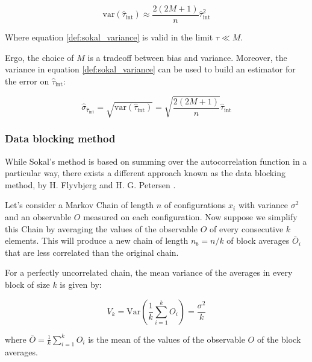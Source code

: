 \begin{equation}
    \label{def:sokal_variance}
    \mathrm{var}(\widehat{\tau}_{\mathrm{int}}) \approx \frac{2(2M + 1)}{n} \hat{\tau}_{\mathrm{int}}^2
\end{equation}

Where equation \ref{def:sokal_variance} is valid in the limit $\tau \ll M$.

Ergo, the choice of $M$ is a tradeoff between bias and variance. Moreover, the variance in equation \ref{def:sokal_variance} can be used to build an estimator for the error on $\hat{\tau}_{\text{int}}$:

\begin{equation}
    \label{def:tau_sokal_error}
    \hat{\sigma}_{\hat{\tau}_{\text{int}}} = \sqrt{\mathrm{var}(\widehat{\tau}_{\mathrm{int}})} = \sqrt{\frac{2(2M + 1)}{n}} \hat{\tau}_{\mathrm{int}}
\end{equation}

\FloatBarrier

\subsubsection{Data blocking method}

While Sokal's method is based on summing over the autocorrelation function in a particular way, there exists a different approach known as the data blocking method, by H. Flyvbjerg and H. G. Petersen \cite{flyv-peter}.

Let's consider a Markov Chain of length $n$ of configurations ${x_i}$ with variance $\sigma^2$ and an observable $O$ measured on each configuration. Now suppose we simplify this Chain by averaging the values of the observable $O$ of every consecutive $k$ elements. This will produce a new chain of length $n_b = n / k$ of block averages $\bar{O}_i$ that are less correlated than the original chain.

For a perfectly uncorrelated chain, the mean variance of the averages in every block of size $k$ is given by:

\begin{equation}
	\label{eq:vks}
	V_k = \mathrm{Var}\left(\frac{1}{k} \sum_{i=1}^k O_i\right) = \frac{\sigma^2}{k}
\end{equation}

where $\bar{O} = \frac{1}{k} \sum_{i=1}^{k} O_i$ is the mean of the values of the observable $O$ of the block averages.

